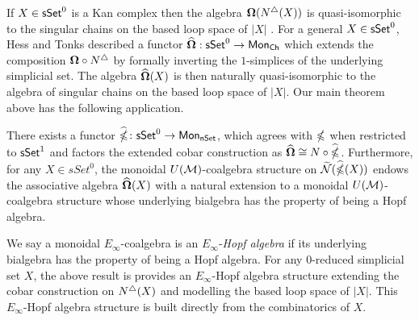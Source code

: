If $X \in \mathsf{sSet}^0$ is a Kan complex then the algebra $\mathbf{\Omega}(N^{\triangle}(X))$ is quasi-isomorphic to the singular chains on the based loop space of $|X|$ \cite{Rivera-Zeinalian}. For a general $X \in \mathsf{sSet}^0$, Hess and Tonks described a functor $\widehat{\mathbf{\Omega}}: \mathsf{sSet}^0 \to \mathsf{Mon}_{\mathsf{Ch}}$ which extends the composition $\mathbf{\Omega} \circ N^{\triangle}$ by formally inverting the $1$-simplices of the underlying simplicial set. The algebra $\widehat{\mathbf{\Omega}}(X)$ is then naturally quasi-isomorphic to the algebra of singular chains on the based loop space of $|X|$. Our main theorem above has the following application. 


\begin{theorem}
There exists a functor $\widehat{\mathbb{\Omega}} \colon \mathsf{sSet}^0 \to \mathsf{Mon}_{\mathsf{nSet}}$, which agrees with $\mathbb{\Omega}$ when restricted to $\mathsf{sSet}^1$ and factors the extended cobar construction as $\widehat{\mathbf{\Omega}} \cong N \circ \widehat{\mathbb{\Omega}}$. Furthermore, for any $X \in sSet^0$, the monoidal $U(\mathcal{M})$-coalgebra structure on $\widetilde{\mathcal{N}}(\widehat{\mathbb{\Omega}}(X))$ endows the associative algebra $\widehat{\mathbf{\Omega}}(X)$ with a natural extension to a monoidal $U(\mathcal{M})$-coalgebra structure whose underlying bialgebra has the property of being a Hopf algebra.
\end{theorem}

We say a monoidal $E_{\infty}$-coalgebra is an $E_{\infty}$-\textit{Hopf algebra} if its underlying bialgebra has the property of being a Hopf algebra. For any $0$-reduced simplicial set $X$, the above result is provides an $E_{\infty}$-Hopf algebra structure extending the cobar construction on $N^{\triangle}(X)$ and modelling the based loop space of $|X|$. This $E_{\infty}$-Hopf algebra structure is built directly from the combinatorics of $X$. 


